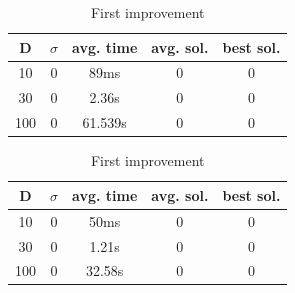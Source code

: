\documentclass{article}
\begin{document}
 
\begin{table}[htbp]
\begin{minipage}{.4\linewidth}
    \centering

    \begin{tabular}{|c|c|c|c|c|}
    \hline
    D   & $\sigma$  & avg. time     & avg. sol.     & best sol. \\
    \hline
    10  & 0         & 89ms          & 0       & 0 \\
    \hline
    30  & 0         & 2.36s         & 0       & 0 \\
    \hline
    100 & 0         & 61.539s       & 0       & 0 \\
    \hline
    \end{tabular}
    \caption{Best improvement}
  \end{minipage}%
  \quad %
  \begin{minipage}{.75\linewidth}
    \centering

    \begin{tabular}{|c|c|c|c|c|}
    \hline
    D   & $\sigma$  & avg. time     & avg. sol.     & best sol. \\
    \hline
    10  & 0         & 50ms          & 0             & 0 \\
    \hline
    30  & 0         & 1.21s         & 0             & 0 \\
    \hline
    100 & 0         & 32.58s        & 0             & 0 \\
    \hline
    \end{tabular}
    \caption{First improvement}
  \end{minipage}
\end{table}
\end{document}
